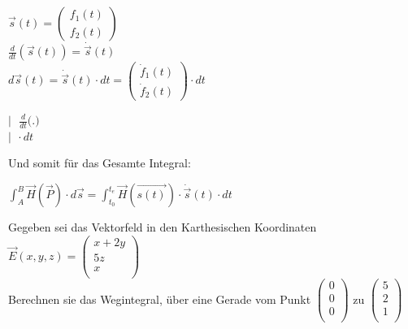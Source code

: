 \fboxsep=0pt
\begin{minipage}[t]{0.68\linewidth}

	\begin{flushright}
		$ \vec{s}(t) = \left(\begin{array}{c} f_1(t) \\ f_2(t)  \end{array}\right)$ \\
		\fspace
		$ \displaystyle \frac{d}{dt}(\vec{s}(t)) = \dot{\vec{s}}(t) $ \\
		\fspace
		$ \displaystyle d\vec{s}(t) = \dot{\vec{s}}(t) \cdot dt = \left(\begin{array}{c} \dot{f}_1(t) \\ \dot{f}_2(t)  \end{array}\right) \cdot dt	$
	\end{flushright}
\end{minipage}
\hfill%
\begin{minipage}[t]{0.28\linewidth}
	\begin{flushleft}
$ \displaystyle \big | \ \ \  \frac{d}{dt} \big ( . \big ) $ \\

\fspace
\fspace
\fspace
$\displaystyle  \big |\ \  \cdot dt$ \\

\end{flushleft}
\end{minipage}


\begin{center}

\end{center}



Und somit für das Gesamte Integral: \\
\begin{center}
	$ \displaystyle \int_A^B \vec{H}(\vec{P})\cdot d\vec{s} = \int_{t_0}^{t_e} \vec{H}(\vec{s(t)})\cdot \dot{\vec{s}}(t) \cdot dt $
\end{center}
\iend


\beginbsp
Gegeben sei das Vektorfeld in den Karthesischen Koordinaten $\vec{E}(x,y,z) =  \left(\begin{array}{c} x + 2y \\ 5z\\ x\\ \end{array}\right) $ \\
Berechnen sie das Wegintegral, über eine Gerade vom Punkt $\left(\begin{array}{c} 0 \\ 0\\ 0\\ \end{array}\right)$ zu $\left(\begin{array}{c} 5 \\ 2\\ 1\\ \end{array}\right)$
\iend


